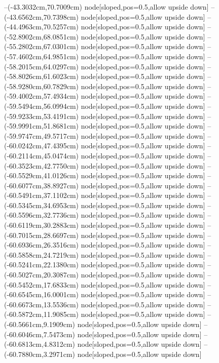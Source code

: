 --(-43.3032cm,70.7009cm) node[sloped,pos=0.5,allow upside down]{\ArrowIn}
--(-43.6562cm,70.7398cm) node[sloped,pos=0.5,allow upside down]{\arrowIn}
--(-44.4963cm,70.5257cm) node[sloped,pos=0.5,allow upside down]{\arrowIn}
--(-52.8902cm,68.0851cm) node[sloped,pos=0.5,allow upside down]{\ArrowIn}
--(-55.2802cm,67.0301cm) node[sloped,pos=0.5,allow upside down]{\ArrowIn}
--(-57.4602cm,64.9851cm) node[sloped,pos=0.5,allow upside down]{\ArrowIn}
--(-58.2015cm,64.0297cm) node[sloped,pos=0.5,allow upside down]{\ArrowIn}
--(-58.8026cm,61.6023cm) node[sloped,pos=0.5,allow upside down]{\ArrowIn}
--(-58.9280cm,60.7829cm) node[sloped,pos=0.5,allow upside down]{\arrowIn}
--(-59.4002cm,57.4934cm) node[sloped,pos=0.5,allow upside down]{\ArrowIn}
--(-59.5494cm,56.0994cm) node[sloped,pos=0.5,allow upside down]{\ArrowIn}
--(-59.9233cm,53.4191cm) node[sloped,pos=0.5,allow upside down]{\ArrowIn}
--(-59.9991cm,51.8681cm) node[sloped,pos=0.5,allow upside down]{\ArrowIn}
--(-59.9747cm,49.5717cm) node[sloped,pos=0.5,allow upside down]{\ArrowIn}
--(-60.0242cm,47.4395cm) node[sloped,pos=0.5,allow upside down]{\ArrowIn}
--(-60.2114cm,45.0474cm) node[sloped,pos=0.5,allow upside down]{\ArrowIn}
--(-60.3523cm,42.7750cm) node[sloped,pos=0.5,allow upside down]{\ArrowIn}
--(-60.5529cm,41.0126cm) node[sloped,pos=0.5,allow upside down]{\ArrowIn}
--(-60.6077cm,38.8927cm) node[sloped,pos=0.5,allow upside down]{\ArrowIn}
--(-60.5491cm,37.1102cm) node[sloped,pos=0.5,allow upside down]{\ArrowIn}
--(-60.5345cm,34.6953cm) node[sloped,pos=0.5,allow upside down]{\ArrowIn}
--(-60.5596cm,32.7736cm) node[sloped,pos=0.5,allow upside down]{\ArrowIn}
--(-60.6119cm,30.2883cm) node[sloped,pos=0.5,allow upside down]{\ArrowIn}
--(-60.7015cm,28.6697cm) node[sloped,pos=0.5,allow upside down]{\ArrowIn}
--(-60.6936cm,26.3516cm) node[sloped,pos=0.5,allow upside down]{\ArrowIn}
--(-60.5858cm,24.7219cm) node[sloped,pos=0.5,allow upside down]{\ArrowIn}
--(-60.5241cm,22.1380cm) node[sloped,pos=0.5,allow upside down]{\ArrowIn}
--(-60.5027cm,20.3087cm) node[sloped,pos=0.5,allow upside down]{\ArrowIn}
--(-60.5452cm,17.6833cm) node[sloped,pos=0.5,allow upside down]{\ArrowIn}
--(-60.6545cm,16.0001cm) node[sloped,pos=0.5,allow upside down]{\ArrowIn}
--(-60.6673cm,13.5536cm) node[sloped,pos=0.5,allow upside down]{\ArrowIn}
--(-60.5872cm,11.9085cm) node[sloped,pos=0.5,allow upside down]{\ArrowIn}
--(-60.5661cm,9.1909cm) node[sloped,pos=0.5,allow upside down]{\ArrowIn}
--(-60.6046cm,7.5473cm) node[sloped,pos=0.5,allow upside down]{\ArrowIn}
--(-60.6813cm,4.8312cm) node[sloped,pos=0.5,allow upside down]{\ArrowIn}
--(-60.7880cm,3.2971cm) node[sloped,pos=0.5,allow upside down]{\ArrowIn}
